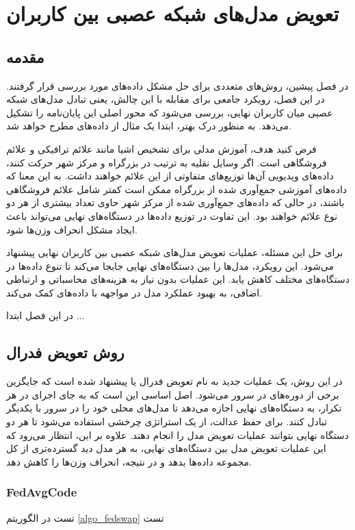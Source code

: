 \chapter{تعویض مدل‌های شبکه عصبی بین کاربران}

\section{مقدمه}
در فصل پیشین، روش‌های متعددی برای حل مشکل داده‌های
مورد بررسی قرار گرفتند. در این فصل، رویکرد جامعی برای مقابله با این چالش، یعنی تبادل مدل‌های شبکه عصبی میان کاربران نهایی، بررسی می‌شود که محور اصلی این پایان‌نامه را تشکیل می‌دهد. به منظور درک بهتر، ابتدا یک مثال از داده‌های
مطرح خواهد شد.

فرض کنید هدف، آموزش مدلی برای تشخیص اشیا مانند علائم ترافیکی و علائم فروشگاهی است. اگر وسایل نقلیه به ترتیب در بزرگراه و مرکز شهر حرکت کنند، داده‌های ویدیویی آن‌ها توزیع‌های متفاوتی از این علائم خواهند داشت. به این معنا که داده‌های آموزشی جمع‌آوری شده از بزرگراه ممکن است کمتر شامل علائم فروشگاهی باشند، در حالی که داده‌های جمع‌آوری شده از مرکز شهر حاوی تعداد بیشتری از هر دو نوع علائم خواهند بود. این تفاوت در توزیع داده‌ها در دستگاه‌های نهایی می‌تواند باعث ایجاد مشکل انحراف وزن‌ها شود.

برای حل این مسئله، عملیات تعویض مدل‌های شبکه عصبی بین کاربران نهایی پیشنهاد می‌شود. این رویکرد، مدل‌ها را بین دستگاه‌های نهایی جابجا می‌کند تا تنوع داده‌ها در دستگاه‌های مختلف کاهش یابد. این عملیات بدون نیاز به هزینه‌های محاسباتی و ارتباطی اضافی، به بهبود عملکرد مدل در مواجهه با داده‌های
کمک می‌کند.

در این فصل ابتدا ...

\section{
	روش تعویض فدرال%
}
در این روش، یک عملیات جدید به نام تعویض فدرال یا
پیشنهاد شده است که جایگزین برخی از دوره‌های
در سرور می‌شود. اصل اساسی
این است که به جای اجرای
در هر تکرار، به دستگاه‌های نهایی اجازه می‌دهد تا مدل‌های محلی خود را در سرور با یکدیگر تبادل کنند. برای حفظ عدالت، از یک استراتژی چرخشی استفاده می‌شود تا هر دو دستگاه نهایی بتوانند عملیات تعویض مدل را انجام دهند. علاوه بر این، انتظار می‌رود که این عملیات تعویض مدل بین دستگاه‌های نهایی، به هر مدل دید گسترده‌تری از کل مجموعه داده‌ها بدهد و در نتیجه، انحراف وزن‌ها را کاهش دهد.

\subsection{FedAvgCode}
تست در الگوریتم
\ref{algo_fedswap}
تست


